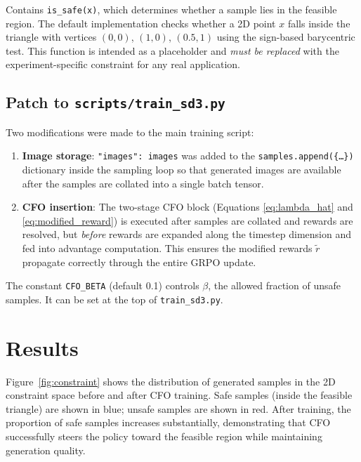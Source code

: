 \documentclass[11pt]{article}
\begin{document}
Contains \texttt{is\_safe(x)}, which determines whether a sample lies in the
feasible region. The default implementation checks whether a 2D point $x$
falls inside the triangle with vertices $(0,0)$, $(1,0)$, $(0.5,1)$ using the
sign-based barycentric test. This function is intended as a placeholder and
\emph{must be replaced} with the experiment-specific constraint for any real
application.

\subsection{Patch to \texttt{scripts/train\_sd3.py}}

Two modifications were made to the main training script:

\begin{enumerate}
    \item \textbf{Image storage}: \texttt{"images": images} was added to the
    \texttt{samples.append(\{\ldots\})} dictionary inside the sampling loop so
    that generated images are available after the samples are collated into a
    single batch tensor.

    \item \textbf{CFO insertion}: The two-stage CFO block (Equations
    \eqref{eq:lambda_hat} and \eqref{eq:modified_reward}) is executed after
    samples are collated and rewards are resolved, but \emph{before} rewards
    are expanded along the timestep dimension and fed into advantage
    computation. This ensures the modified rewards $\tilde{r}$ propagate
    correctly through the entire GRPO update.
\end{enumerate}

The constant \texttt{CFO\_BETA} (default 0.1) controls $\beta$, the allowed
fraction of unsafe samples. It can be set at the top of
\texttt{train\_sd3.py}.

\section{Results}

Figure~\ref{fig:constraint} shows the distribution of generated samples in the
2D constraint space before and after CFO training. Safe samples (inside the
feasible triangle) are shown in blue; unsafe samples are shown in red. After
training, the proportion of safe samples increases substantially, demonstrating
that CFO successfully steers the policy toward the feasible region while
maintaining generation quality.
\end{document}
